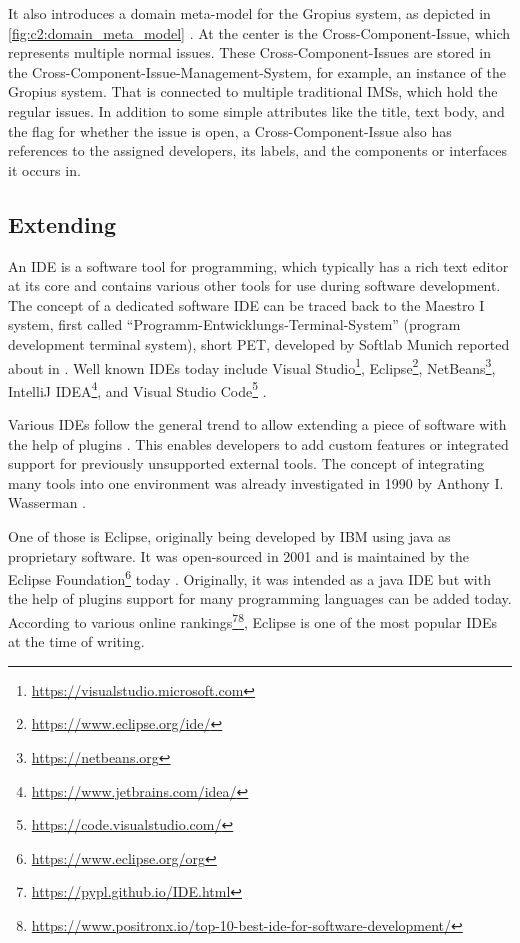 It also introduces a domain meta-model for the \gls{Gropius} system, as depicted in \cref{fig:c2:domain_meta_model} \cite{speth2020gropius}.
At the center is the Cross-Component-Issue, which represents multiple normal issues.
These Cross-Component-Issues are stored in the Cross-Component-Issue-Management-System, for example, an instance of the \gls{Gropius} system.
That is connected to multiple traditional \glspl{IMS}, which hold the regular issues.
In addition to some simple attributes like the title, text body, and the flag for whether the issue is open, a Cross-Component-Issue also has references to the assigned developers, its labels, and the components or interfaces it occurs in.

\subsection{Extending }
\label{ssec:ch2:ss1.3}
An \gls{IDE} is a software tool for programming, which typically has a rich text editor at its core 
and contains various other tools for use during software development.
The concept of a dedicated software \gls{IDE} can be traced back to the Maestro I system, first called ``Programm-Entwicklungs-Terminal-System'' (program development terminal system), short PET, developed by Softlab Munich reported about in \cite{Computerwoche1975Ide}.
Well known \glspl{IDE} today include Visual Studio\footnote{\url{https://visualstudio.microsoft.com}}, \gls{Eclipse}\footnote{\url{https://www.eclipse.org/ide/}}, NetBeans\footnote{\url{https://netbeans.org}}, IntelliJ IDEA\footnote{\url{https://www.jetbrains.com/idea/}}, and Visual Studio Code\footnote{\url{https://code.visualstudio.com/}} .

Various \glspl{IDE} follow the general trend to allow extending a piece of software with the help of plugins \cite{chang2008issues}.
This enables developers to add custom features or integrated support for previously unsupported external tools.
The concept of integrating many tools into one environment was already investigated in 1990 by Anthony I. Wasserman \cite{wasserman1990tool}.

One of those is \gls{Eclipse}, originally being developed by IBM using \gls{java} as proprietary software.
It was open-sourced in 2001 and is maintained by the Eclipse Foundation\footnote{\url{https://www.eclipse.org/org}}
today \cite{burnette2005eclipse}.
Originally, it was intended as a \gls{java} \gls{IDE} but with the help of plugins support for many programming languages can be added today.
According to various online rankings\footnote{\url{https://pypl.github.io/IDE.html}}\footnote{\url{https://www.positronx.io/top-10-best-ide-for-software-development/}},
\gls{Eclipse} is one of the most popular \glspl{IDE} at the time of writing.

